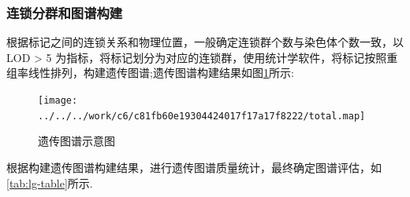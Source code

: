 \documentclass[
  a4paper,
  titlepage]{article}
\begin{document}
\hypertarget{ux8fdeux9501ux5206ux7fa4ux548cux56feux8c31ux6784ux5efa}{%
\subsubsection{连锁分群和图谱构建}\label{ux8fdeux9501ux5206ux7fa4ux548cux56feux8c31ux6784ux5efa}}

根据标记之间的连锁关系和物理位置，一般确定连锁群个数与染色体个数一致，以LOD \textgreater{} 5 为指标，将标记划分为对应的连锁群，使用统计学软件，将标记按照重组率线性排列，构建遗传图谱;遗传图谱构建结果如图\ref{fig:lmap-plot}所示:

\begin{figure}[H]

{\centering \texttt{[image: ../../../work/c6/c81fb60e19304424017f17a17f8222/total.map]} 

}

\caption{遗传图谱示意图}\label{fig:lmap-plot}
\end{figure}

根据构建遗传图谱构建结果，进行遗传图谱质量统计，最终确定图谱评估，如\ref{tab:lg-table}所示.
\end{document}
